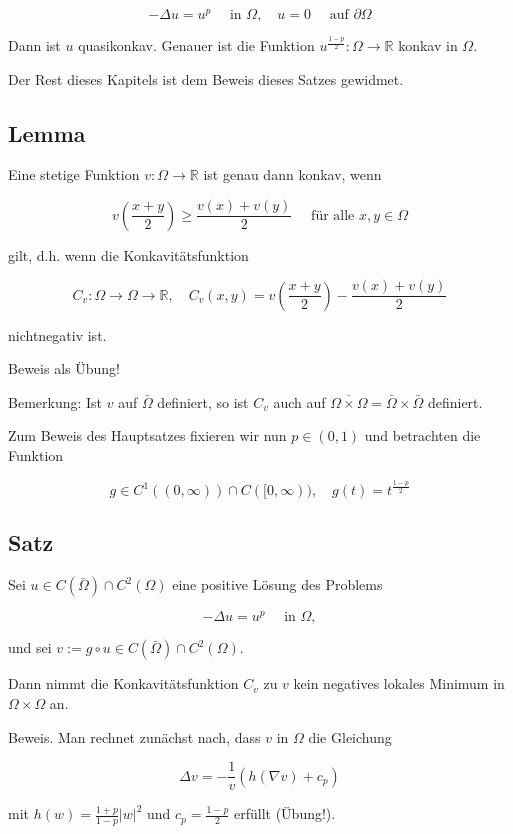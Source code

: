 \documentclass[10pt, letterpaper]{article}
\begin{document}
$$
-\Delta u=u^{p} \quad \text { in } \Omega, \quad u=0 \quad \text { auf } \partial \Omega
$$

Dann ist $u$ quasikonkav. Genauer ist die Funktion $u^{\frac{1-p}{2}}: \Omega \rightarrow \mathbb{R}$ konkav in $\Omega$.

Der Rest dieses Kapitels ist dem Beweis dieses Satzes gewidmet.

\subsection*{Lemma}

Eine stetige Funktion $v: \Omega \rightarrow \mathbb{R}$ ist genau dann konkav, wenn

$$
v\left(\frac{x+y}{2}\right) \geq \frac{v(x)+v(y)}{2} \quad \text { für alle } x, y \in \Omega
$$

gilt, d.h. wenn die Konkavitätsfunktion

$$
C_{v}: \Omega \rightarrow \Omega \rightarrow \mathbb{R}, \quad C_{v}(x, y)=v\left(\frac{x+y}{2}\right)-\frac{v(x)+v(y)}{2}
$$

nichtnegativ ist.

Beweis als Übung!

Bemerkung: Ist $v$ auf $\bar{\Omega}$ definiert, so ist $C_{v}$ auch auf $\overline{\Omega \times \Omega}=\bar{\Omega} \times \bar{\Omega}$ definiert.

Zum Beweis des Hauptsatzes fixieren wir nun $p \in(0,1)$ und betrachten die Funktion

$$
g \in C^{1}((0, \infty)) \cap C([0, \infty)), \quad g(t)=t^{\frac{1-p}{2}}
$$

\subsection*{Satz}

Sei $u \in C(\bar{\Omega}) \cap C^{2}(\Omega)$ eine positive Lösung des Problems

$$
-\Delta u=u^{p} \quad \text { in } \Omega,
$$

und sei $v:=g \circ u \in C(\bar{\Omega}) \cap C^{2}(\Omega)$.

Dann nimmt die Konkavitätsfunktion $C_{v}$ zu $v$ kein negatives lokales Minimum in $\Omega \times \Omega$ an.

Beweis. Man rechnet zunächst nach, dass $v$ in $\Omega$ die Gleichung

$$
\Delta v=-\frac{1}{v}\left(h(\nabla v)+c_{p}\right)
$$

mit $h(w)=\frac{1+p}{1-p}|w|^{2}$ und $c_{p}=\frac{1-p}{2}$ erfüllt (Übung!).
\end{document}
